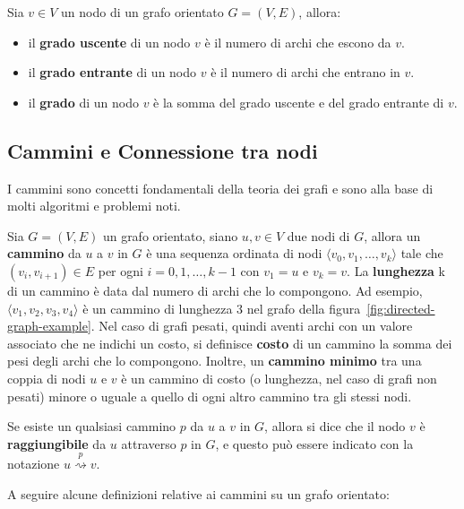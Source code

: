 Sia $v \in V$ un nodo di un grafo orientato $G = (V, E)$, allora:
\begin{itemize}
    \item il \textbf{grado uscente} di un nodo $v$ \`e il numero di archi che escono da $v$.
    \item il \textbf{grado entrante} di un nodo $v$ \`e il numero di archi che entrano in $v$.
    \item il \textbf{grado} di un nodo $v$ \`e la somma del grado uscente e del grado entrante di $v$.
\end{itemize}

\subsection{Cammini e Connessione tra nodi}\label{subsec:cammini}


I cammini sono concetti fondamentali della teoria dei grafi e sono alla base di molti algoritmi e problemi noti. \newline

Sia $G = (V, E)$ un grafo orientato, siano $u, v \in V$ due nodi di $G$, allora un \textbf{cammino} da $u$ a $v$ in $G$
\`e una sequenza ordinata di nodi $\langle v_0, v_1, \ldots, v_k \rangle$ tale che $(v_i, v_{i+1}) \in E$ per ogni
$i = 0, 1, \ldots, k-1$ con $v_1 = u$ e $v_k = v$.
La \textbf{lunghezza} k di un cammino \`e data dal numero di archi che lo compongono.
Ad esempio, $\langle v_1, v_2, v_3, v_4 \rangle$ \`e un cammino di lunghezza 3 nel grafo della
figura~\ref{fig:directed-graph-example}. \newline
Nel caso di grafi pesati, quindi aventi archi con un valore associato che ne indichi un costo, si definisce
\textbf{costo} di un cammino la somma dei pesi degli archi che lo compongono.
Inoltre, un \textbf{cammino minimo} tra una coppia di nodi $u$ e $v$ è un cammino di costo (o lunghezza, nel caso
di grafi non pesati) minore o uguale a quello di ogni altro cammino tra gli stessi nodi.

Se esiste un qualsiasi cammino $p$ da $u$ a $v$ in $G$, allora si dice che il nodo $v$ \`e \textbf{raggiungibile} da
$u$ attraverso $p$ in $G$, e questo pu\`o essere indicato con la notazione $u \overset{p}{\rightsquigarrow} v$. \newline

A seguire alcune definizioni relative ai cammini su un grafo orientato:

